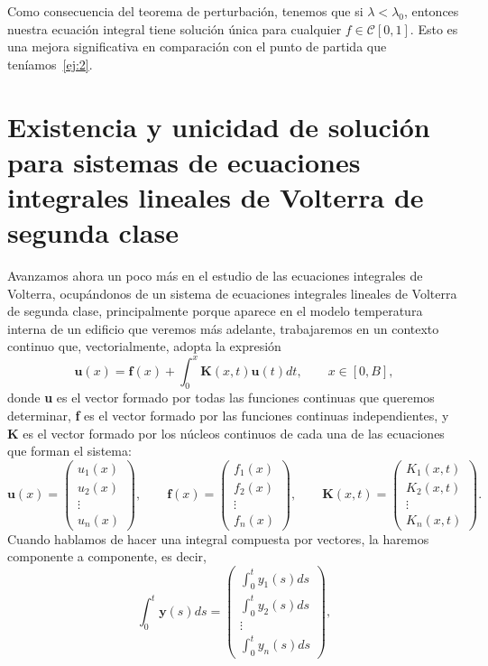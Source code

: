 \begin{ejemplo}
	Como consecuencia del teorema de perturbación, tenemos que si $\lambda < \lambda_0$, entonces nuestra ecuación integral tiene solución única para cualquier $f \in \mathcal{C}[0,1]$. Esto es una mejora significativa en comparación con el punto de partida que teníamos~\eqref{ej:2}.
\end{ejemplo}
\section{Existencia y unicidad de solución para sistemas de ecuaciones integrales lineales de Volterra de segunda clase}
Avanzamos ahora un poco más en el estudio de las ecuaciones integrales de Volterra, ocupándonos de un sistema de ecuaciones integrales lineales de Volterra de segunda clase, principalmente porque aparece en el modelo temperatura interna de un edificio que veremos más adelante, trabajaremos en un contexto continuo que, vectorialmente, adopta la expresión 
\begin{equation}
	\textbf{u}(x) = \textbf{f}(x) + \int_0^x \textbf{K}(x,t)\textbf{u}(t)dt, \qquad x \in [0,B],
\end{equation}
donde \textbf{u} es el vector formado por todas las funciones continuas que queremos determinar, \textbf{f} es el vector formado por las funciones continuas independientes, y \textbf{K} es el vector formado por los núcleos continuos de cada una de las ecuaciones que forman el sistema:
\begin{equation}
	\textbf{u}(x) = \begin{pmatrix}	u_1(x) \\ u_2(x) \\ \vdots \\ u_n(x)	\end{pmatrix}, \qquad \textbf{f}(x) = \begin{pmatrix}	f_1(x) \\ f_2(x) \\ \vdots \\ f_n(x)	\end{pmatrix}, \qquad \textbf{K}(x,t) = \begin{pmatrix}	K_1(x,t) \\ K_2(x,t) \\ \vdots \\ K_n(x,t)	\end{pmatrix}.
\end{equation}
Cuando hablamos de hacer una integral compuesta por vectores, la haremos componente a componente, es decir,
\begin{equation}
	\int_0^t \textbf{y}(s)ds = \begin{pmatrix}
		\displaystyle	\int_0^t y_1(s)ds \\ \displaystyle \int_0^t y_2(s)ds \\ \vdots \\ \displaystyle \int_0^t y_n(s)ds
	\end{pmatrix},
\end{equation}
